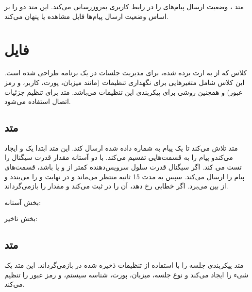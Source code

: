 \documentclass{report}
\begin{document}
متد
، وضعیت ارسال پیام‌های
  را در رابط کاربری به‌روزرسانی می‌کند. این متد دو 
  را بر اساس وضعیت ارسال پیام‌ها قابل مشاهده یا پنهان می‌کند.
\section{فایل
}
کلاس 
 که از
   به ارث برده شده، برای مدیریت جلسات
     در یک برنامه
       طراحی شده است. این کلاس شامل متغیرهایی برای نگهداری تنظیمات
         (مانند میزبان، پورت، کاربر، و رمز عبور) و همچنین روشی برای پیکربندی این تنظیمات می‌باشد. متد
           برای تنظیم جزئیات اتصال
             استفاده می‌شود.

\subsection{متد
}
متد
 تلاش می‌کند تا یک پیام 
  به شماره داده شده ارسال کند. این متد ابتدا یک
   و 
   ایجاد می‌کندو پیام را به قسمت‌هایی تقسیم می‌کند. با دو آستانه مقدار قدرت سیگنال را تست می کند. اگر سیگنال قدرت سلول سرویس‌دهنده کمتر از 
   و یا
    باشد، قسمت‌های پیام را ارسال می‌کند. سپس به مدت 
    15 
    ثانیه منتظر می‌ماند و در نهایت 
    و 
    را می‌بندد و از بین می‌برد. اگر خطایی رخ دهد، آن را در 
     ثبت می‌کند و مقدار 
     را بازمی‌گرداند.
     
     بخش آستانه:

\begin{latin}
	
	\label{code:threshold}
\end{latin}
     بخش تاخیر:
\begin{latin}
	
	\label{code:delay}
\end{latin}

\subsection{متد
}
متد 
پیکربندی جلسه 
را با استفاده از تنظیمات ذخیره شده در
 بازمی‌گرداند. این متد یک شیء 
 را ایجاد می‌کند و نوع جلسه، میزبان، پورت، شناسه سیستم، و رمز عبور را تنظیم می‌کند.
 
\end{document}
